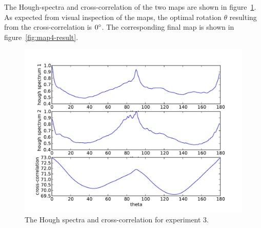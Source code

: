 The Hough-spectra and cross-correlation of the two maps are shown in figure~\ref{fig:map4-hough}. As expected from visual inspection of the maps, the optimal rotation $\theta$ resulting from the cross-correlation is $0\degree$. The corresponding final map is shown in figure~\ref{fig:map4-result}.

\begin{figure}[ht]
\centering
  \includegraphics[width=\textwidth]{images/experiment/map4/hough.pdf}
  \caption{The Hough spectra and cross-correlation for experiment 3.}
  \label{fig:map4-hough}
\end{figure}

